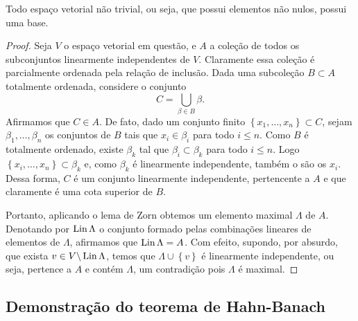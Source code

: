\begin{prop}
    Todo espaço vetorial não trivial, ou seja, que possui elementos não nulos, possui uma base.
\end{prop}
\begin{proof}
    Seja \( V \) o espaço vetorial em questão, e \( A \) a coleção de todos os subconjuntos linearmente independentes de \( V \).
    Claramente essa coleção é parcialmente ordenada pela relação de inclusão.
    Dada uma subcoleção \( B \subset A \) totalmente ordenada, considere o conjunto \[
        C = \bigcup_{ \beta \in B } \beta
    .\]
    Afirmamos que \( C \in A \).
    De fato, dado um conjunto finito \( \left\{ x_{ 1 }, \dots, x_{ n } \right\} \subset C \), sejam \( \beta_{ 1 }, \dots, \beta_{ n } \) os conjuntos de \( B \) tais que \( x_{ i } \in \beta_{ i } \) para todo \( i \leq n \).
    Como \( B \) é totalmente ordenado, existe \( \beta_{ k } \) tal que \( \beta_{ i } \subset \beta_{ k } \) para todo \( i \leq n \).
    Logo \( \left\{ x_{ i }, \dots, x_{ n } \right\} \subset  \beta_{ k } \) e, como \( \beta_{ k } \) é linearmente independente, também o são os \( x_{ i } \).
    Dessa forma, \( C \) é um conjunto linearmente independente, pertencente a \( A \) e que claramente é uma cota superior de \( B \).

    Portanto, aplicando o lema de Zorn obtemos um elemento maximal \( \Lambda \) de \( A \).
    Denotando por \( \operatorname{Lin} \Lambda \) o conjunto formado pelas combinações lineares de elementos de \( \Lambda \), afirmamos que \( \operatorname{Lin} \Lambda = A \).
    Com efeito, supondo, por absurdo, que exista \( v \in V \backslash \operatorname{Lin} \Lambda \), temos que \( \Lambda \cup \left\{ v \right\} \) é linearmente independente, ou seja, pertence a \( A \) e contém \( \Lambda \), um contradição pois \( \Lambda \) é maximal.
\end{proof}

\subsection{Demonstração do teorema de Hahn-Banach}

